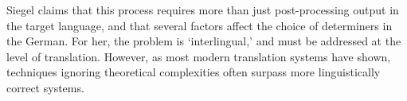 \documentclass[11pt]{article}\usepackage{graphicx, color}
\begin{document}
Siegel claims that this process requires more than just post-processing output in the target language, and that several factors affect the choice of determiners in the German. For her, the problem is `interlingual,' and must be addressed at the level of translation.
However, as most modern translation systems have shown, techniques ignoring theoretical complexities often surpass more linguistically correct systems.

\end{document}
